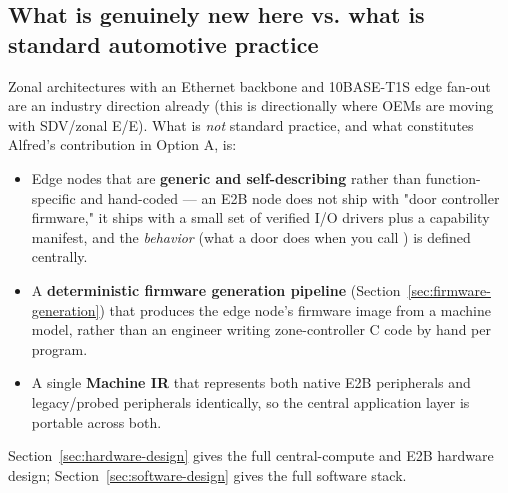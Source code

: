 \subsection{What is genuinely new here vs. what is standard automotive practice}

Zonal architectures with an Ethernet backbone and 10BASE-T1S edge fan-out are an industry direction already (this is directionally where OEMs are moving with SDV/zonal E/E). What is \emph{not} standard practice, and what constitutes Alfred's contribution in Option A, is:

\begin{itemize}
\item Edge nodes that are \textbf{generic and self-describing} rather than function-specific and hand-coded --- an E2B node does not ship with "door controller firmware," it ships with a small set of verified I/O drivers plus a capability manifest, and the \emph{behavior} (what a door does when you call ) is defined centrally.
\item A \textbf{deterministic firmware generation pipeline} (Section~\ref{sec:firmware-generation}) that produces the edge node's firmware image from a machine model, rather than an engineer writing zone-controller C code by hand per program.
\item A single \textbf{Machine IR} that represents both native E2B peripherals and legacy/probed peripherals identically, so the central application layer is portable across both.
\end{itemize}

Section~\ref{sec:hardware-design} gives the full central-compute and E2B hardware design; Section~\ref{sec:software-design} gives the full software stack.
